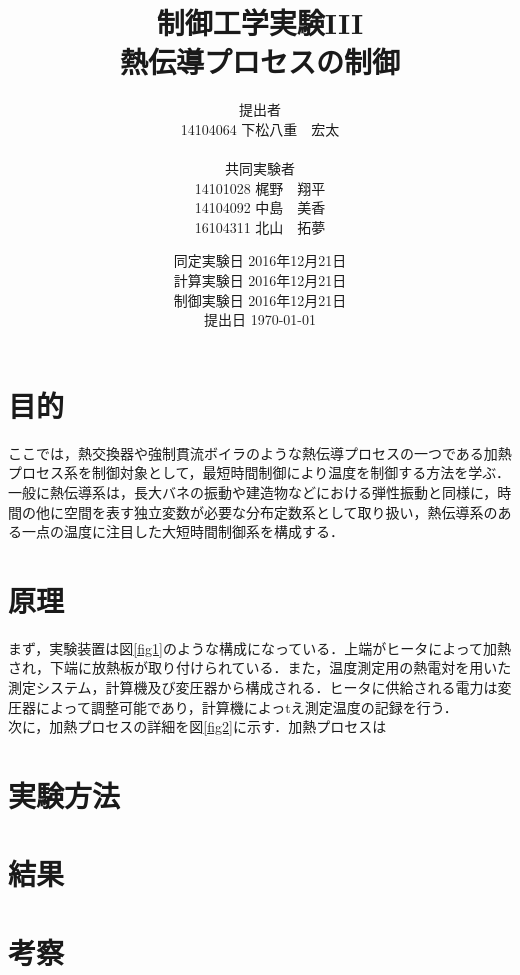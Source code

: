 \documentclass[11pt,a4paper]{jsarticle}
\begin{document}
\title{制御工学実験I\hspace{-0.1mm}I\hspace{-0.1mm}I \\ 熱伝導プロセスの制御}
\author{提出者 \\ 14104064 下松八重　宏太 \\ \\ 共同実験者 \\ 14101028 梶野　翔平 \\ 14104092 中島　美香 \\ 16104311 北山　拓夢}
\date{同定実験日 2016年12月21日 \\ 計算実験日 2016年12月21日 \\ 制御実験日 2016年12月21日 \\ 提出日 \today}



\maketitle
\thispagestyle{empty}
\newpage


\section{目的}
ここでは，熱交換器や強制貫流ボイラのような熱伝導プロセスの一つである加熱プロセス系を制御対象として，最短時間制御により温度を制御する方法を学ぶ．一般に熱伝導系は，長大バネの振動や建造物などにおける弾性振動と同様に，時間の他に空間を表す独立変数が必要な分布定数系として取り扱い，熱伝導系のある一点の温度に注目した大短時間制御系を構成する．

\section{原理}
まず，実験装置は図\ref{fig1}のような構成になっている．上端がヒータによって加熱され，下端に放熱板が取り付けられている．また，温度測定用の熱電対を用いた測定システム，計算機及び変圧器から構成される．ヒータに供給される電力は変圧器によって調整可能であり，計算機によっtえ測定温度の記録を行う． \\
次に，加熱プロセスの詳細を図\ref{fig2}に示す．加熱プロセスは

\section{実験方法}
\section{結果}
\section{考察}
\end{document}
